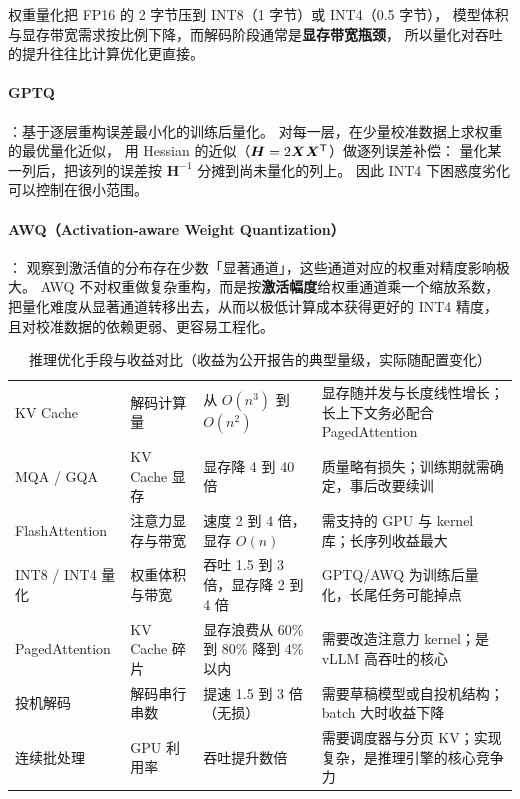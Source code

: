 权重量化把 FP16 的 2 字节压到 INT8（1 字节）或 INT4（0.5 字节），
模型体积与显存带宽需求按比例下降，而解码阶段通常是\textbf{显存带宽瓶颈}，
所以量化对吞吐的提升往往比计算优化更直接。

\paragraph{GPTQ}：基于逐层重构误差最小化的训练后量化。
对每一层，在少量校准数据上求权重的最优量化近似，
用 Hessian 的近似（$\bm{H} = 2\bm{X}\bm{X}^{\mathsf{T}}$）做逐列误差补偿：
量化某一列后，把该列的误差按 $\bm{H}^{-1}$ 分摊到尚未量化的列上。
因此 INT4 下困惑度劣化可以控制在很小范围。

\paragraph{AWQ（Activation-aware Weight Quantization）}：
观察到激活值的分布存在少数「显著通道」，这些通道对应的权重对精度影响极大。
AWQ 不对权重做复杂重构，而是按\textbf{激活幅度}给权重通道乘一个缩放系数，
把量化难度从显著通道转移出去，从而以极低计算成本获得更好的 INT4 精度，
且对校准数据的依赖更弱、更容易工程化。

\begin{table}[htbp]
\centering
\caption{推理优化手段与收益对比（收益为公开报告的典型量级，实际随配置变化）}
\label{tab:inference-opt}
\small
\begin{tabularx}{\textwidth}{L{2.3cm} L{2.0cm} L{1.7cm} Y}
\toprule
{} &  &  &  \\
\midrule
KV Cache & 解码计算量 & 从 $O(n^3)$ 到 $O(n^2)$ & 显存随并发与长度线性增长；长上下文务必配合 PagedAttention \\
\addlinespace
MQA / GQA & KV Cache 显存 & 显存降 4 到 40 倍 & 质量略有损失；训练期就需确定，事后改要续训 \\
\addlinespace
FlashAttention & 注意力显存与带宽 & 速度 2 到 4 倍，显存 $O(n)$ & 需支持的 GPU 与 kernel 库；长序列收益最大 \\
\addlinespace
INT8 / INT4 量化 & 权重体积与带宽 & 吞吐 1.5 到 3 倍，显存降 2 到 4 倍 & GPTQ/AWQ 为训练后量化，长尾任务可能掉点 \\
\addlinespace
PagedAttention & KV Cache 碎片 & 显存浪费从 60\% 到 80\% 降到 4\% 以内 & 需要改造注意力 kernel；是 vLLM 高吞吐的核心 \\
\addlinespace
投机解码 & 解码串行串数 & 提速 1.5 到 3 倍（无损） & 需要草稿模型或自投机结构；batch 大时收益下降 \\
\addlinespace
连续批处理 & GPU 利用率 & 吞吐提升数倍 & 需要调度器与分页 KV；实现复杂，是推理引擎的核心竞争力 \\
\bottomrule
\end{tabularx}
\end{table}


